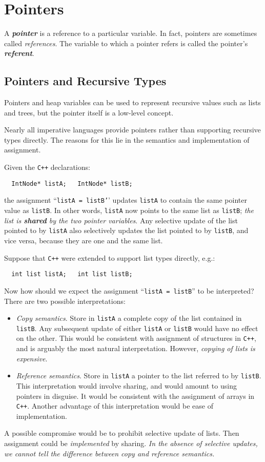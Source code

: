 \section{Pointers}

A \textit{\textbf{pointer}} is a reference to a particular variable. In fact, pointers are sometimes called \textit{references}. The variable to which a pointer refers is called the pointer's \textit{\textbf{referent}}.

\subsection{Pointers and Recursive Types}

Pointers and heap variables can be used to represent recursive values such as lists and trees, but the pointer itself is a low-level concept.

Nearly all imperative languages provide pointers rather than supporting recursive types directly. The reasons for this lie in the semantics and implementation of assignment.

\noindent Given the \texttt{C++} declarations:
\begin{verbatim}
  IntNode* listA;   IntNode* listB;
\end{verbatim}
the assignment ``\texttt{listA = listB'}' updates \texttt{listA} to contain the same pointer value as \texttt{listB}. In other words, \texttt{listA} now points to the same list as \texttt{listB}; \textit{the list is \textbf{shared} by the two pointer variables}. Any selective update of the list pointed to by \texttt{listA} also selectively updates the list pointed to by \texttt{listB}, and vice versa, because they are one and the same list.

\noindent Suppose that \texttt{C++} were extended to support list types directly, e.g.:
\begin{verbatim}
  int list listA;   int list listB;
\end{verbatim}
Now how should we expect the assignment ``\texttt{listA = listB}'' to be interpreted? There are two possible interpretations:
\begin{itemize}
  \item \textit{Copy semantics}. Store in \texttt{listA} a complete copy of the list contained in \texttt{listB}. Any subsequent update of either \texttt{listA} or \texttt{listB} would have no effect on the other. This would be consistent with assignment of structures in \texttt{C++}, and is arguably the most natural interpretation. However, \textit{copying of lists is expensive}.
  \item \textit{Reference semantics}. Store in \texttt{listA} a pointer to the list referred to by \texttt{listB}. This interpretation would involve sharing, and would amount to using pointers in disguise. It would be consistent with the assignment of arrays in \texttt{C++}. Another advantage of this interpretation would be ease of implementation.
\end{itemize}
A possible compromise would be to prohibit selective update of lists. Then assignment could be \textit{implemented} by sharing. \textit{In the absence of selective updates, we cannot tell the difference between copy and reference semantics.}

